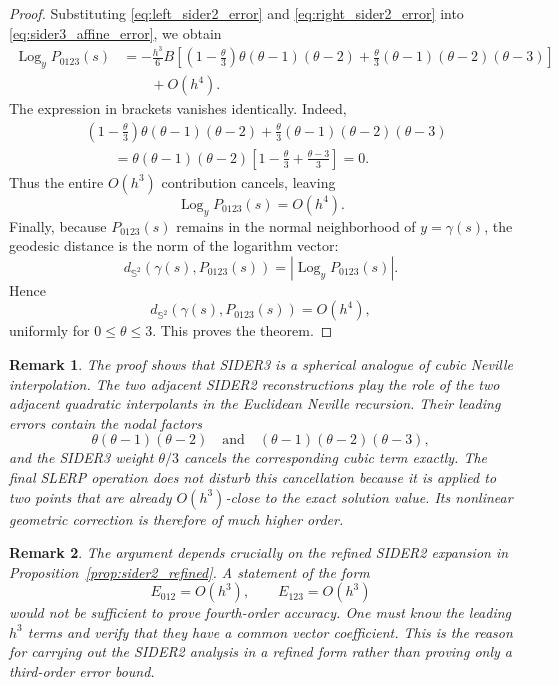 \documentclass[a4paper,11pt]{article}
\newcommand{\bS}{\mathbb{S}}
\newcommand{\Log}{\operatorname{Log}}
\newtheorem{remark}{Remark}
\numberwithin{equation}{section}
\begin{document}
\begin{proof}
Substituting \eqref{eq:left_sider2_error} and
\eqref{eq:right_sider2_error} into \eqref{eq:sider3_affine_error}, we obtain
\[
\begin{aligned}
\Log_y P_{0123}(s)
&=
-\frac{h^3}{6}B
\left[
\left(1-\frac{\theta}{3}\right)
\theta(\theta-1)(\theta-2)
+
\frac{\theta}{3}
(\theta-1)(\theta-2)(\theta-3)
\right]     \\
&\qquad
+O(h^4).
\end{aligned}
\]
The expression in brackets vanishes identically.  Indeed,
\[
\begin{aligned}
&\left(1-\frac{\theta}{3}\right)
\theta(\theta-1)(\theta-2)
+
\frac{\theta}{3}
(\theta-1)(\theta-2)(\theta-3)       \\
&\qquad
=
\theta(\theta-1)(\theta-2)
\left[
1-\frac{\theta}{3}
+
\frac{\theta-3}{3}
\right]
=0 .
\end{aligned}
\]
Thus the entire \(O(h^3)\) contribution cancels, leaving
\[
        \Log_y P_{0123}(s)=O(h^4).
\]
Finally, because \(P_{0123}(s)\) remains in the normal neighborhood of
\(y=\gamma(s)\), the geodesic distance is the norm of the logarithm vector:
\[
        d_{\bS^2}\!\left(\gamma(s),P_{0123}(s)\right)
        =
        \left|\Log_y P_{0123}(s)\right|.
\]
Hence
\[
        d_{\bS^2}\!\left(\gamma(s),P_{0123}(s)\right)
        =O(h^4),
\]
uniformly for \(0\leq\theta\leq3\).  This proves the theorem.
\end{proof}

\begin{remark}
The proof shows that SIDER3 is a spherical analogue of cubic Neville
interpolation.  The two adjacent SIDER2 reconstructions play the role of the
two adjacent quadratic interpolants in the Euclidean Neville recursion.  Their
leading errors contain the nodal factors
\[
        \theta(\theta-1)(\theta-2)
        \quad\text{and}\quad
        (\theta-1)(\theta-2)(\theta-3),
\]
and the SIDER3 weight \(\theta/3\) cancels the corresponding cubic term
exactly.  The final SLERP operation does not disturb this cancellation because
it is applied to two points that are already \(O(h^3)\)-close to the exact
solution value.  Its nonlinear geometric correction is therefore of much
higher order.
\end{remark}

\begin{remark}
The argument depends crucially on the refined SIDER2 expansion in
Proposition~\ref{prop:sider2_refined}.  A statement of the form
\[
        E_{012}=O(h^3),\qquad E_{123}=O(h^3)
\]
would not be sufficient to prove fourth-order accuracy.  One must know the
leading \(h^3\) terms and verify that they have a common vector coefficient.
This is the reason for carrying out the SIDER2 analysis in a refined form
rather than proving only a third-order error bound.
\end{remark}
\end{document}
